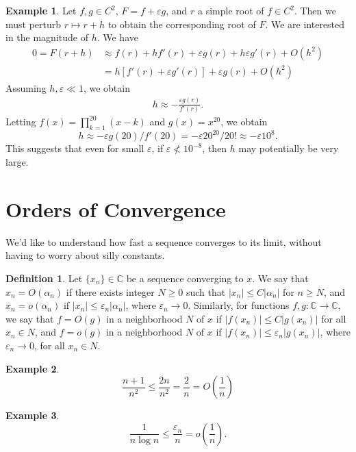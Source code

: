 \documentclass[12pt]{article}
\newcommand{\cc}{\mathbb{C}}
\newcommand{\ee}{\varepsilon}
\theoremstyle{plain}
\theoremstyle{definition}
\newtheorem*{definition}{Definition}
\newtheorem*{example}{Example}
\theoremstyle{remark}
\numberwithin{equation}{section}  %
\begin{document}
\begin{example}
	Let $f, g \in C^2$, $F = f + \ee g$, and $r$ a simple root of $f \in C^2$.
	Then we must perturb $r \mapsto r + h$ to obtain the corresponding
	root of $F$. We are interested in the magnitude of $h$. We have
	\begin{align*}
		0 = F(r + h) & \approx f(r) + hf'(r) + \ee g(r) + h\ee g'(r) + O(h^2)
		\\
		& = h[f'(r)  + \ee g'(r)] + \ee g(r)  + O(h^2)
	\end{align*}
	Assuming $h, \ee \ll 1$, we obtain 
	\begin{align*}
		h \approx -\frac{\ee g(r)}{f'(r)}.
	\end{align*}
	Letting $f(x) = \prod_{k=1}^{20} (x-k)$ and $g(x) = x^{20}$, we obtain
	\[h \approx -\ee g(20)/f'(20) = -\ee 20^20/20! \approx -\ee 10^8.\]
	This suggests that even for small $\ee$, if $\ee \not < 10^{-8}$,
	then $h$ may potentially be very large. 
\end{example}
\section{Orders of Convergence}
We'd like to understand how fast a sequence converges to its limit, without
having to worry about silly constants.
\begin{definition}
	Let $\{x_{n}\} \in \mathbb{C}$ be a sequence converging to $x$. We say that
	$x_{n} = O(\alpha_{n})$ if there exists integer $N \ge 0$ such that
	$|x_{n}| \le C |\alpha_{n}|$ for $n \ge N$, and $ x_n = o(\alpha_n )$ if $|x_n| \le \ee_n |\alpha_n |$, where $\ee_n \to 0$.
	Similarly, for functions $f,g: \cc \to \cc$, we say that $f = O(g)$ in a
	neighborhood $N$ of $x$ if $|f(x_n) | \le C |g(x_n)|$ for all $x_n \in N$, and 
	$f = o(g)$ in a neighborhood $N$ of $x$ if $|f(x_n) | \le \ee_n |g(x_n)|$,
	where $\ee_n \to 0$,  for all $x_n \in N$.
\end{definition}

\begin{example}
	\begin{equation*}
		\frac{n+1}{n^2} \le \frac{2n}{n^2} = \frac{2}{n} = O\left(\frac{1}{n} \right)	
	\end{equation*}
\end{example}
\begin{example}
	\begin{equation*}
		\frac{1}{n \log n} \le \frac{\ee_n}{n} = o\left(\frac{1}{n}\right).
	\end{equation*}
\end{example}
\end{document}
